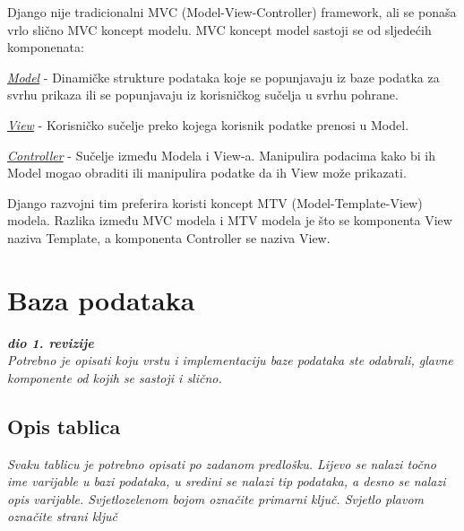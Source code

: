 Django nije tradicionalni MVC (Model-View-Controller) framework, ali se ponaša vrlo slično MVC koncept modelu. MVC koncept model sastoji se od sljedećih komponenata: 
\begin{packed_item}
	\item{\underline{\textit{Model}} - Dinamičke strukture podataka koje se popunjavaju iz baze podatka za svrhu prikaza ili se popunjavaju iz korisničkog sučelja u svrhu pohrane.}
	\item{\underline{\textit{View}} - Korisničko sučelje preko kojega korisnik podatke prenosi u Model.}
	\item{\underline{\textit{Controller}} - Sučelje između Modela i View-a. Manipulira podacima kako bi ih Model mogao obraditi ili manipulira podatke da ih View može prikazati.}
\end{packed_item}

Django razvojni tim preferira koristi koncept MTV (Model-Template-View) modela. Razlika između MVC modela i MTV modela je što se komponenta View naziva Template, a komponenta Controller se naziva View.

\pagebreak
	
	

				
		\section{Baza podataka}
			
			\textbf{\textit{dio 1. revizije}}\\
			
		\textit{Potrebno je opisati koju vrstu i implementaciju baze podataka ste odabrali, glavne komponente od kojih se sastoji i slično.}
		
			\subsection{Opis tablica}
			

				\textit{Svaku tablicu je potrebno opisati po zadanom predlošku. Lijevo se nalazi točno ime varijable u bazi podataka, u sredini se nalazi tip podataka, a desno se nalazi opis varijable. Svjetlozelenom bojom označite primarni ključ. Svjetlo plavom označite strani ključ}
				
